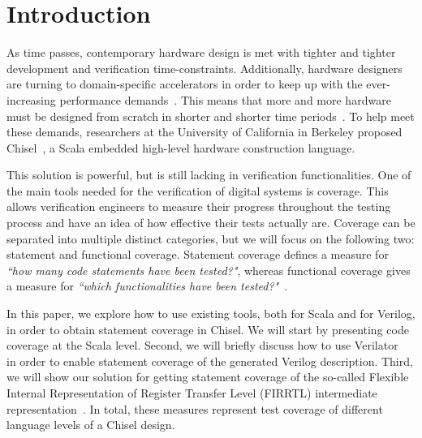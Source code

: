 \documentclass[conference]{IEEEtran}
\newcommand{\martin}[1]{{\color{blue} Martin: #1}}
\begin{document}

\section{Introduction}
\label{sec:objectives}
As time passes, contemporary hardware design is met with tighter and tighter development and verification time-constraints. Additionally, hardware designers are turning to domain-specific accelerators in order to keep up with the ever-increasing performance demands~\cite{henn-patt:turing:2019}. This means that more and more hardware must be designed from scratch in shorter and shorter time periods~\cite{domain-hw-acc:2020}.  To help meet these demands, researchers at the University of California in Berkeley proposed Chisel~\cite{chisel:dac2012}, a Scala embedded high-level hardware construction language.

This solution is powerful, but is still lacking in verification functionalities. One of the main tools needed for the verification of digital systems is coverage. This allows verification engineers to measure their progress throughout the testing process and have an idea of how effective their tests actually are. Coverage can be separated into multiple distinct categories, but we will focus on the following two: statement and functional coverage. Statement coverage defines a measure for \textit{``how many code statements have been tested?"}, whereas functional coverage gives a measure for \textit{``which functionalities have been tested?"}~\cite{spear2008systemverilog}.


In this paper, we explore how to use existing tools, both for Scala and for Verilog, in order to obtain statement coverage in Chisel. We will start by presenting code coverage at the Scala level. Second, we will briefly discuss how to use Verilator~\cite{verilator} in order to enable statement coverage of the generated Verilog description. Third, we will show our solution for getting statement coverage of the so-called Flexible Internal Representation of Register Transfer Level (FIRRTL) intermediate representation~\cite{firrtl}. In total, these measures represent test coverage of different language levels of a Chisel design.
\end{document}
